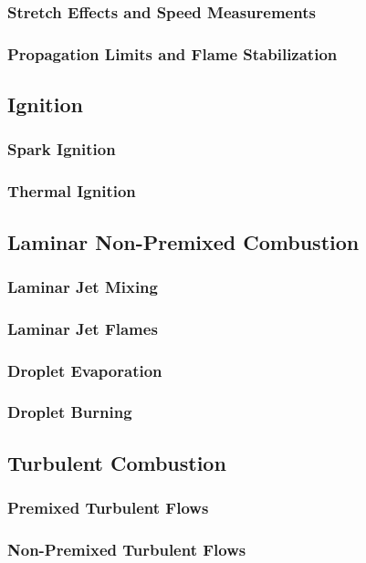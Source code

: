 \documentclass[11pt]{article}
\begin{document}
\subsubsection{Stretch Effects and Speed Measurements}
\subsubsection{Propagation Limits and Flame Stabilization}

\subsection{Ignition}
\subsubsection{Spark Ignition}
\subsubsection{Thermal Ignition}

\subsection{Laminar Non-Premixed Combustion}
\subsubsection{Laminar Jet Mixing}
\subsubsection{Laminar Jet Flames}
\subsubsection{Droplet Evaporation}
\subsubsection{Droplet Burning}

\subsection{Turbulent Combustion}
\subsubsection{Premixed Turbulent Flows}

\subsubsection{Non-Premixed Turbulent Flows}
\newpage
\end{document}
